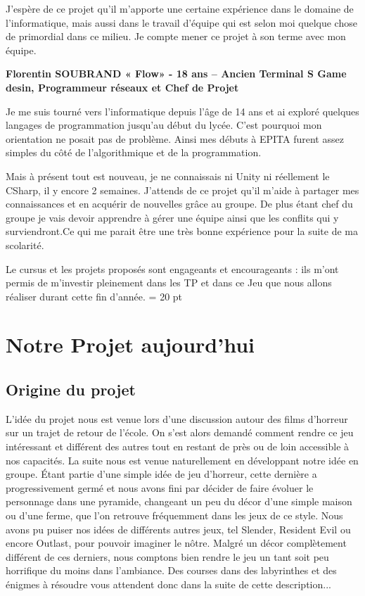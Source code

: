 \documentclass[12pt,a4paper]{article}
\begin{document}
J’espère de ce projet qu’il m’apporte une certaine expérience dans le domaine de l’informatique, mais aussi dans le travail d’équipe qui est selon moi quelque chose de primordial dans ce milieu. Je compte mener ce projet à son terme avec mon équipe.

\begin{center}
\textbf{Florentin SOUBRAND « Flow» - 18 ans – Ancien Terminal S \newline
Game desin, Programmeur réseaux et Chef de Projet}
\end{center}
	Je me suis tourné vers l'informatique depuis l'âge de 14 ans et ai exploré quelques langages de programmation jusqu'au début du lycée. C'est pourquoi mon orientation ne posait pas de problème. Ainsi mes débuts à EPITA furent assez simples du côté de l'algorithmique et de la programmation.

	Mais à présent tout est nouveau, je ne connaissais ni Unity ni réellement le CSharp, il y encore 2 semaines. J'attends de ce projet qu'il m'aide à partager mes connaissances et en acquérir de nouvelles grâce au groupe. De plus étant chef du groupe je vais devoir apprendre à gérer une équipe ainsi que les conflits qui y surviendront.Ce qui me parait être une très bonne expérience pour la suite de ma scolarité.
	
	Le cursus et les projets proposés sont engageants et encourageants : ils m'ont permis de m'investir pleinement dans les TP et dans ce Jeu que nous allons réaliser durant cette fin d'année.
\baselineskip = 20 pt
\newpage
\section{Notre Projet aujourd'hui}
\subsection{Origine du projet}
L'idée du projet nous est venue lors d'une discussion autour des films
d'horreur sur un trajet de retour de l'école. On s'est alors demandé comment rendre ce
jeu intéressant et différent des autres tout en restant de près ou de loin accessible à nos capacités.
La suite nous est venue naturellement en développant
notre idée en groupe. Étant partie d'une simple idée de jeu d'horreur, cette dernière a progressivement germé et
nous avons fini par décider de faire évoluer le personnage dans une pyramide, changeant un peu du
décor d'une simple maison ou d'une ferme, que l'on retrouve fréquemment dans les jeux de ce style.
Nous avons pu puiser nos idées de différents autres jeux, tel Slender, Resident Evil ou encore Outlast,
pour pouvoir imaginer le nôtre. Malgré un décor complètement différent de ces derniers, nous
comptons bien rendre le jeu un tant soit peu horrifique du moins dans l'ambiance.
Des courses dans des labyrinthes et des énigmes à résoudre vous attendent donc dans la suite de cette
description...
\end{document}
